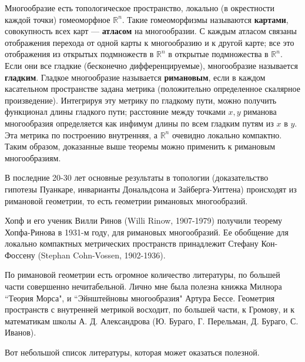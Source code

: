 \documentclass[12pt]{book}
\def\R{{\mathbb R}}
\theoremstyle{upshape}
\theoremstyle{generic}
\theoremstyle{upshapenonumber}
\newcommand{\следствие}{%
     \refstepcounter{teorema}
     {\noindent\bf Следствие \thechapter.\arabic{teorema}:\ }}
\newcommand{\пример}{%
     \refstepcounter{teorema}
     {\noindent\bf Пример \thechapter.\arabic{teorema}:\ }}
\newcommand{\лемма}{%
     \refstepcounter{teorema}
     {\noindent\bf Лемма \thechapter.\arabic{teorema}:\ }}
\newcommand{\теорема}{%
     \refstepcounter{teorema}
     {\noindent\bf Теорема \thechapter.\arabic{teorema}:\ }}
\newcommand{\утверждение}{%
     \refstepcounter{teorema}
     {\noindent\bf Утверждение \thechapter.\arabic{teorema}:\ }}
\def\бф{\bf}
\begin{document}
Многообразие есть топологическое пространство, локально
(в ок\-рес\-тности каждой точки) гомеоморфное $\R^n$.
Такие гомеоморфизмы называются {\бф картами},
совокупность всех карт --- {\бф атласом} на многообразии.
С каждым атласом связаны отображения перехода от 
одной карты к многообразию и к другой карте;
все это отображения из открытых подмножеств в $\R^n$ 
в открытые подмножества в $\R^n$. Если они все гладкие
(бесконечно дифференцируемые), многообразие называется
{\бф гладким}. Гладкое многообразие называется
{\бф римановым}, если в каждом касательном пространстве
задана метрика (положительно определенное скалярное
произведение). Интегрируя эту метрику по гладкому пути, 
можно получить функционал длины гладкого пути;
расстояние между точками $x,y$ риманова многообразия
определяется как инфимум длины по всем гладким 
путям из $x$ в $y$. Эта метрика по построению внутренняя,
а $\R^n$ очевидно локально компактно. Таким 
образом, доказанные выше теоремы можно применить 
к римановым многообразиям.

В последние 20-30 лет основные результаты
в топологии (доказательство гипотезы Пуанкаре, 
инварианты Дональдсона и Зайберга-Уиттена) происходят 
из римановой геометрии, то есть геометрии римановых
многообразий.

Хопф и его ученик Вилли Ринов (Willi Rinow, 1907-1979) получили
теорему Хопфа-Ринова в 1931-м году, для римановых
многообразий. Ее обобщение для локально компактных метрических
пространств принадлежит Стефану Кон-Фоссену
(Stephan Cohn-Vossen, 1902-1936).

По римановой геометрии есть огромное количество
литературы, по большей части совершенно нечитабельной.
Лично мне была полезна книжка Милнора ``Теория Морса",
и ``Эйнштейновы многообразия" Артура Бессе.
Геометрия пространств с внутренней метрикой восходит,
по большей части, к Громову, и к математикам школы 
А. Д. Александрова (Ю. Бураго, 
Г. Перельман, Д. Бураго, С. Иванов). 

Вот небольшой список литературы, которая может оказаться полезной.
\end{document}
